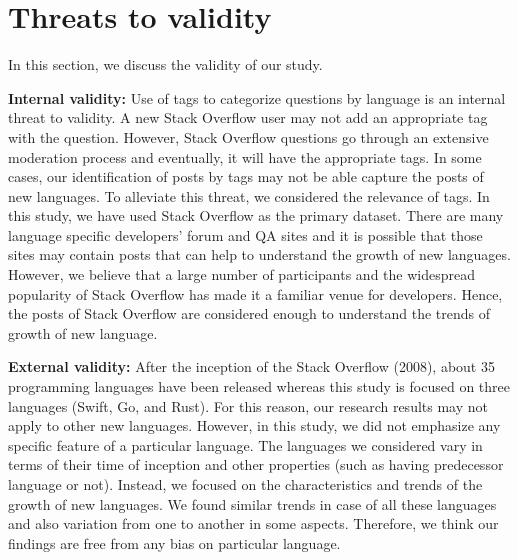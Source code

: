 \section{Threats to validity}
\label{sec:validity}
In this section, we discuss the validity of our study.

\indent \textbf{Internal validity:} Use of tags to categorize questions by language is an internal threat to validity. A new Stack Overflow user may not add an appropriate tag with the question. However, Stack Overflow questions go through an extensive moderation process and eventually, it will have the appropriate tags. In some cases, our identification of posts by tags may not be able capture the posts of new languages. To alleviate this threat, we considered the relevance of tags.  In this study, we have used Stack Overflow as the primary dataset. There are many language specific developers' forum and QA sites and it is possible that those sites may contain posts that can help to understand the growth of new languages. However, we believe that a large number of participants and the widespread popularity of Stack Overflow has made it a familiar venue for developers. Hence, the posts of Stack Overflow are considered enough to understand the trends of growth of new language.

\indent \textbf{External validity:} After the inception of the Stack Overflow (2008), about 35 programming languages have been released\citep{wiki:Timeline} whereas this study is focused on three languages (Swift, Go, and Rust). For this reason, our research results may not apply to other new languages. However, in this study, we did not emphasize any specific feature of a particular language. The languages we considered vary in terms of their time of inception and other properties (such as having predecessor language or not). Instead, we focused on the characteristics and trends of the growth of new languages. We found similar trends in case of all these languages and also variation from one to another in some aspects. Therefore, we think our findings are free from any bias on particular language.

\iffalse

\indent \textbf{Construct validity:} In this study, votes of accepted answers are given double weight in the calculation of post quality. The weight used may not represent their exact contribution. However, the magnitude of weight do not influence our analysis. Thus, double weight in the accepted answer will not invalidate our claim.
\fi